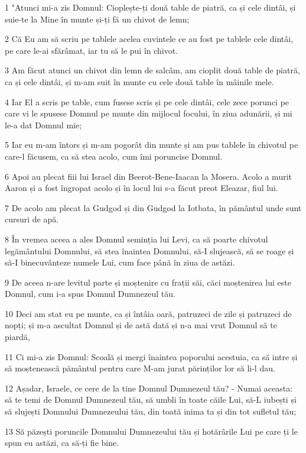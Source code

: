 \par 1 "Atunci mi-a zis Domnul: Cioplește-ți două table de piatră, ca și cele dintâi, și suie-te la Mine în munte și-ți fă un chivot de lemn;
\par 2 Că Eu am să scriu pe tablele acelea cuvintele ce au fost pe tablele cele dintâi, pe care le-ai sfărâmat, iar tu să le pui în chivot.
\par 3 Am făcut atunci un chivot din lemn de salcâm, am cioplit două table de piatră, ca și cele dintâi, și m-am suit în munte cu cele două table în mâinile mele.
\par 4 Iar El a scris pe table, cum fusese scris și pe cele dintâi, cele zece porunci pe care vi le spusese Domnul pe munte din mijlocul focului, în ziua adunării, și mi le-a dat Domnul mie;
\par 5 Iar eu m-am întors și m-am pogorât din munte și am pus tablele în chivotul pe care-l făcusem, ca să stea acolo, cum îmi poruncise Domnul.
\par 6 Apoi au plecat fiii lui Israel din Beerot-Bene-Iaacan la Mosera. Acolo a murit Aaron și a fost îngropat acolo și în locul lui s-a făcut preot Eleazar, fiul lui.
\par 7 De acolo am plecat la Gudgod și din Gudgod la Iotbata, în pământul unde sunt cursuri de apă.
\par 8 În vremea aceea a ales Domnul seminția lui Levi, ca să poarte chivotul legământului Domnului, să stea înaintea Domnului, să-I slujească, să se roage și să-I binecuvânteze numele Lui, cum face până în ziua de astăzi.
\par 9 De aceea n-are levitul parte și moștenire cu frații săi, căci moștenirea lui este Domnul, cum i-a spus Domnul Dumnezeul tău.
\par 10 Deci am stat eu pe munte, ca și întâia oară, patruzeci de zile și patruzeci de nopți; și m-a ascultat Domnul și de astă dată și n-a mai vrut Domnul să te piardă,
\par 11 Ci mi-a zis Domnul: Scoală și mergi înaintea poporului acestuia, ca să intre și să moștenească pământul pentru care M-am jurat părinților lor să li-l dau.
\par 12 Așadar, Israele, ce cere de la tine Domnul Dumnezeul tău? - Numai aceasta: să te temi de Domnul Dumnezeul tău, să umbli în toate căile Lui, să-L iubești și să slujești Domnului Dumnezeului tău, din toată inima ta și din tot sufletul tău;
\par 13 Să păzești poruncile Domnului Dumnezeului tău și hotărârile Lui pe care ți le spun eu astăzi, ca să-ți fie bine.
